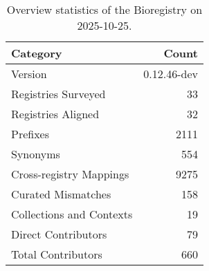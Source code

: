 \begin{table}
\caption{Overview statistics of the Bioregistry on 2025-10-25.}
\label{tab:bioregistry-summary}
\begin{tabular}{lr}
\toprule
Category & Count \\
\midrule
Version & 0.12.46-dev \\
Registries Surveyed & 33 \\
Registries Aligned & 32 \\
Prefixes & 2111 \\
Synonyms & 554 \\
Cross-registry Mappings & 9275 \\
Curated Mismatches & 158 \\
Collections and Contexts & 19 \\
Direct Contributors & 79 \\
Total Contributors & 660 \\
\bottomrule
\end{tabular}
\end{table}
